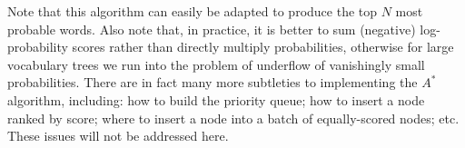 \documentclass[a4paper]{article}
\begin{document}
Note that this algorithm can easily be adapted to produce the top $N$ most probable words.
Also note that, in practice, it is better to sum (negative) log-probability scores rather than directly multiply probabilities,
otherwise for large vocabulary trees we run into the problem of underflow of vanishingly small probabilities.
There are in fact many more subtleties to implementing the $A^*$ algorithm, including: how to build the priority queue;
how to insert a node ranked by score;
where to insert a node into a batch of equally-scored nodes; etc. These issues will not be addressed here.

{}

\end{document}
